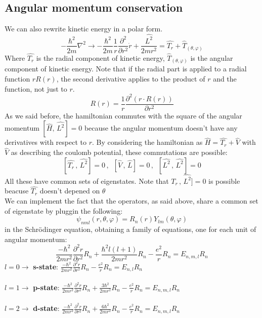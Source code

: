 \subsection{Angular momentum conservation}
We can also rewrite kinetic energy in a polar form.\\
\[
-\frac{\hbar^2}{2m}\nabla^2 \rightarrow-\frac{\hbar^2}{2m}\frac{1}{r}\frac{\partial^2}{\partial r^2}\dot{r}+\frac{\hat{L^2}}{2mr^2} = \hat{T_r}+\hat{T}_{(\theta,\varphi)}
\]
Where $\hat{T_r}$ is the radial component of kinetic energy, $\hat{T}_{(\theta,\varphi)}$ is the angular component of kinetic energy. Note that if the radial part is applied to a radial function $rR(r)$, the second derivative applies to the product of $r$ and the function, not just to $r$.
\[
R(r)=\frac{1}{r}\frac{\partial^2(r\cdot R(r))}{\partial r^2}
\]
As we said before, the hamiltonian commutes with the square of the angular momentum $[\hat{H},\,\hat{L^2}]=0$ because the angular momentum doesn't have any derivatives with respect to $r$. By considering the hamiltonian as $\hat{H}=\hat{T_r}+\hat{V}$ with $\hat{V}$ as describing the coulomb potential, these commutations are possible:\\
\[
[\hat{T_r}\,,\,\hat{L^2}]=0\,,\,\,\,[\hat{V}\,,\,\hat{L}]=0\,,\,\,\,[\hat{L^2}\,,\,\hat{L^2}]=0
\]
All these have common sets of eigenstates. Note that $\hat{T_r}\,,\,\hat{L^2}]=0$ is possible beacuse $\hat{T_r}$ doesn't depened on $\theta$ \\
\newline
We can implement the fact that the operators, as said above, share a common set of eigenstate by pluggin the following:
\[
\psi_{nml}(r, \theta, \varphi) = R_n(r)Y_{lm}(\theta, \varphi)
\]
in the Schr\"odinger equation, obtaining a family of equations, one for each unit of angular momentum:
\[
\frac{-\hbar^2}{2mr^2}\frac{\partial^2r}{\partial r^2}R_n+\frac{\hbar^2l(l+1)}{2mr^2}R_n-\frac{e^2}{r}R_n=E_{n,m,l}R_n
\]
$l=0 \rightarrow$ \textbf{s-state}: $\frac{-\hbar^2}{2mr^2}\frac{\partial^2r}{\partial r^2}R_n-\frac{e^2}{r}R_n=E_{n,l}R_n$\\
\\
$l=1 \rightarrow$ \textbf{p-state}: $\frac{-\hbar^2}{2mr^2}\frac{\partial^2r}{\partial r^2}R_n+\frac{3\hbar^2}{2mr^2}R_n-\frac{e^2}{r}R_n=E_{n,m,l}R_n$\\
\\
$l=2 \rightarrow$ \textbf{d-state}: $\frac{-\hbar^2}{2mr^2}\frac{\partial^2r}{\partial r^2}R_n+\frac{6\hbar^2}{2mr^2}R_n-\frac{e^2}{r}R_n=E_{n,m,l}R_n$\\
